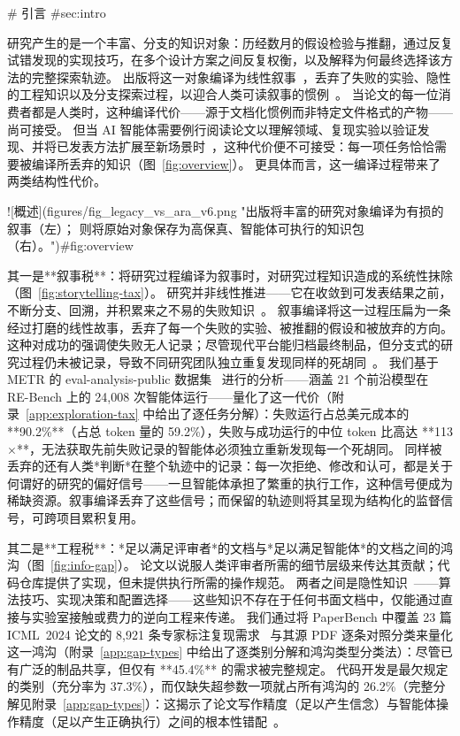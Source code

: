 \begin{markdown}
# 引言 {#sec:intro}

研究产生的是一个丰富、分支的知识对象：历经数月的假设检验与推翻，通过反复试错发现的实现技巧，在多个设计方案之间反复权衡，以及解释为何最终选择该方法的完整探索轨迹。
出版将这一对象编译为线性叙事~\citep{medawar1963fraud, canini2026stopwriting}，丢弃了失败的实验、隐性的工程知识以及分支探索过程，以迎合人类可读叙事的惯例~\citep{rosenthal1979filedrawer, franco2014publication}。
当论文的每一位消费者都是人类时，这种编译代价——源于文档化惯例而非特定文件格式的产物——尚可接受。
但当 AI 智能体需要例行阅读论文以理解领域、复现实验以验证发现、并将已发表方法扩展至新场景时~\citep{lu2024aiscientist, liu2026ainative}，这种代价便不可接受：每一项任务恰恰需要被编译所丢弃的知识（图~\ref{fig:overview}）。
更具体而言，这一编译过程带来了两类结构性代价。

![概述](figures/fig_legacy_vs_ara_v6.png "出版将丰富的研究对象编译为有损的叙事（左）；\ara{} 则将原始对象保存为高保真、智能体可执行的知识包（右）。"){#fig:overview}

其一是**叙事税**：将研究过程编译为叙事时，对研究过程知识造成的系统性抹除（图~\ref{fig:storytelling-tax}）。
研究并非线性推进——它在收敛到可发表结果之前，不断分支、回溯，并积累来之不易的失败知识~\citep{kuhn1962structure,medawar1963fraud}。
叙事编译将这一过程压扁为一条经过打磨的线性故事，丢弃了每一个失败的实验、被推翻的假设和被放弃的方向。
这种对成功的强调使失败无人记录；尽管现代平台能归档最终制品，但分支式的研究过程仍未被记录，导致不同研究团队独立重复发现同样的死胡同~\citep{rosenthal1979filedrawer, franco2014publication}。
我们基于 METR 的 eval-analysis-public 数据集~\citep{wijk2025rebench} 进行的分析——涵盖 21 个前沿模型在 RE-Bench 上的 24{,}008 次智能体运行——量化了这一代价（附录~\ref{app:exploration-tax} 中给出了逐任务分解）：失败运行占总美元成本的 **90.2\%**（占总 token 量的 59.2\%），失败与成功运行的中位 token 比高达 **113$\times$**，无法获取先前失败记录的智能体必须独立重新发现每一个死胡同。
同样被丢弃的还有人类*判断*在整个轨迹中的记录：每一次拒绝、修改和认可，都是关于何谓好的研究的偏好信号——一旦智能体承担了繁重的执行工作，这种信号便成为稀缺资源。叙事编译丢弃了这些信号；而保留的轨迹则将其呈现为结构化的监督信号，可跨项目累积复用。

其二是**工程税**：*足以满足评审者*的文档与*足以满足智能体*的文档之间的鸿沟（图~\ref{fig:info-gap}）。
论文以说服人类评审者所需的细节层级来传达其贡献；代码仓库提供了实现，但未提供执行所需的操作规范。
两者之间是隐性知识~\citep{polanyi1966tacit}——算法技巧、实现决策和配置选择——这些知识不存在于任何书面文档中，仅能通过直接与实验室接触或费力的逆向工程来传递。
我们通过将 PaperBench 中覆盖 23 篇 ICML~2024 论文的 8{,}921 条专家标注复现需求~\citep{starace2025paperbench} 与其源 PDF 逐条对照分类来量化这一鸿沟（附录~\ref{app:gap-types} 中给出了逐类别分解和鸿沟类型分类法）：尽管已有广泛的制品共享，但仅有 **45.4\%** 的需求被完整规定。
代码开发是最欠规定的类别（充分率为 37.3\%），而仅缺失超参数一项就占所有鸿沟的 26.2\%（完整分解见附录~\ref{app:gap-types}）：这揭示了论文写作精度（足以产生信念）与智能体操作精度（足以产生正确执行）之间的根本性错配~\citep{stodden2016enhancing, baker2016reproducibility}。


\end{markdown}

